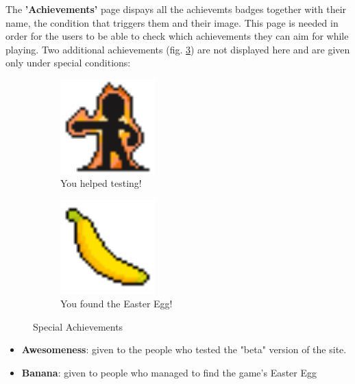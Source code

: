 \documentclass{mproj}
\begin{document}
The \textbf{'Achievements'} page dispays all the achievemts badges together with their name, the condition that triggers them and their image. This page is needed in order for the users to be able to check which achievements they can aim for while playing. Two additional achievements (fig. \ref{fig: specialachievements}) are not displayed here and are given only under special conditions:

\begin{figure}[!h]
        \centering
        \begin{subfigure} [!h] {0.4\textwidth}
                \centering
                \includegraphics [width=0.4\textwidth] {awesome.png}
                \caption{You helped testing!}
                \label{}
        \end{subfigure}
        \space
        \space
        \begin{subfigure} [!h] {0.4\textwidth}
                \centering
                \includegraphics [width=0.4\textwidth] {banana.png}
                \caption{You found the Easter Egg!}
                \label{}
        \end{subfigure}
        \caption{Special Achievements}
        \label{fig: specialachievements}
\end{figure}

\begin{itemize}
  	\item \textbf{Awesomeness}: given to the people who tested the "beta" version of the site.
  	\item \textbf{Banana}: given to people who managed to find the game's Easter Egg
\end{itemize} 
\end{document}
